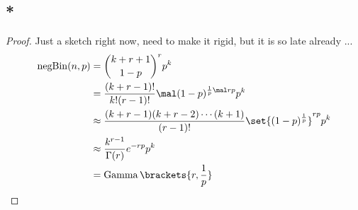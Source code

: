 \subsection{*}
\begin{proof}
	Just a sketch right now, need to make it rigid, but it is so late already ...
	\begin{align*}
		\negBin(n,p) &= \binom{k+r+1}{1-p}^r p^k\\
		&= \frac{(k+r-1)!}{k!(r-1)!}\mal (1-p)^{\frac{1}{p}\mal rp}p^k\\
		&\approx \frac{(k+r-1)(k+r-2)\cdots(k+1)}{(r-1)!}\set{(1-p)^{\frac{1}{p}}}^{rp}p^k\\
		&\approx \frac{k^{r-1}}{\Gamma(r)}e^{-rp}p^k\\
		&= \Gam\brackets{r,\frac{1}{p}}
	\end{align*}
\end{proof}